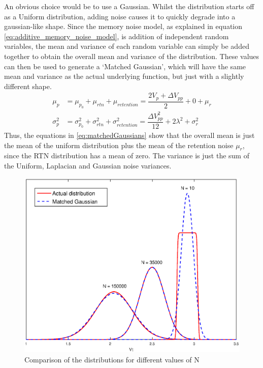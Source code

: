 \documentclass[11pt]{article}
\numberwithin{equation}{subsection}
\begin{document}
An obvious choice would be to use a Gaussian. Whilst the distribution starts off as a Uniform distribution, adding noise causes it to quickly degrade into a gaussian-like shape. Since the memory noise model, as explained in equation \ref{eq:additive_memory_noise_model}, is addition of independent random variables, the mean and variance of each random variable can simply be added together to obtain the overall mean and variance of the distribution. These values can then be used to generate a `Matched Gaussian', which will have the same mean and variance as the actual underlying function, but just with a slightly different shape. 
\begin{equation} \label{eq:matchedGaussians}
\begin{aligned}
\mu_p &= \mu_{p_0} + \mu_{rtn} + \mu_{retention} = \dfrac{2 V_p + \Delta V_{pp}}{2} + 0 +\mu_r \\
\sigma_p^2 &= \sigma^2_{p_0} + \sigma^2_{rtn} + \sigma^2_{retention} = \dfrac{\Delta V_{pp}^2}{12} + 2\lambda^2 + \sigma^2_{r}
\end{aligned}
\end{equation}
Thus, the equations in \ref{eq:matchedGaussians} show that the overall mean is just the mean of the uniform distribution plus the mean of the retention noise $\mu_r$, since the RTN distribution has a mean of zero. The variance is just the sum of the Uniform, Laplacian and Gaussian noise variances.
\begin{figure}[ht]
\centering
\includegraphics[scale=0.7]{matched_gaussian}
\caption{Comparison of the distributions for different values of N}
\label{fig:MMGaussianVsFull}
\end{figure}
\end{document}
